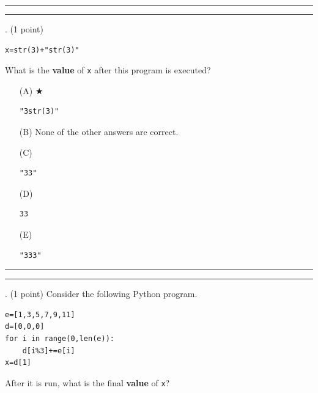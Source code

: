 \documentclass{article}
\begin{document}
\vspace*{2em}
\hrule
\vspace{2em}

\vspace{2em}
\hrule height 2pt


\newpage
{}. (1 point)
\begin{verbatim}
x=str(3)+"str(3)"
\end{verbatim}
What is the \textbf{value} of \texttt{x} after this program is executed?


\begin{enumerate}
\item[(A)] $\bigstar$ 
\begin{verbatim}"3str(3)"\end{verbatim}

\item[(B)]
None of the other answers are correct.

\item[(C)]
\begin{verbatim}"33"\end{verbatim}

\item[(D)]
\begin{verbatim}33\end{verbatim}

\item[(E)]
\begin{verbatim}"333"\end{verbatim}

\end{enumerate}

\vspace*{2em}
\hrule
\vspace{2em}

\vspace{2em}
\hrule height 2pt


\newpage
{}. (1 point)
Consider the following Python program.
\begin{verbatim}
e=[1,3,5,7,9,11]
d=[0,0,0]
for i in range(0,len(e)):
    d[i%3]+=e[i]
x=d[1]
\end{verbatim}
After it is run, what is the final \textbf{value} of \texttt{x}?
\end{document}

